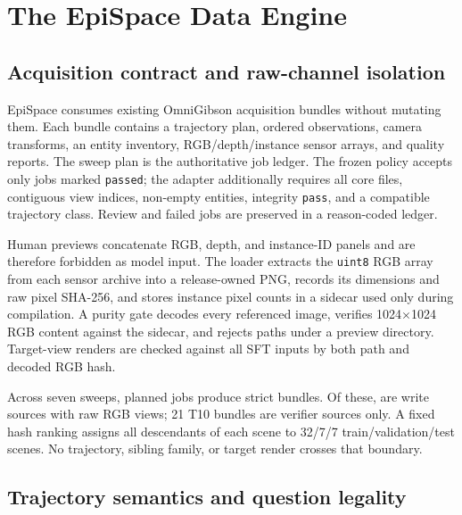 \section{The EpiSpace Data Engine}
\label{sec:engine}

\subsection{Acquisition contract and raw-channel isolation}

EpiSpace consumes existing OmniGibson acquisition bundles without mutating
them.  Each bundle contains a trajectory plan, ordered observations, camera
transforms, an entity inventory, RGB/depth/instance sensor arrays, and quality
reports.  The sweep plan is the authoritative job ledger.  The frozen policy
accepts only jobs marked \texttt{passed}; the adapter additionally requires all
core files, contiguous view indices, non-empty entities, integrity
\texttt{pass}, and a compatible trajectory class.  Review and failed jobs are
preserved in a reason-coded ledger.

Human previews concatenate RGB, depth, and instance-ID panels and are therefore
forbidden as model input.  The loader extracts the \texttt{uint8} RGB array from
each sensor archive into a release-owned PNG, records its dimensions and raw
pixel SHA-256, and stores instance pixel counts in a sidecar used only during
compilation.  A purity gate decodes every referenced image, verifies
1024$\times$1024 RGB content against the sidecar, and rejects paths under a
preview directory.  Target-view renders are checked against all SFT inputs by
both path and decoded RGB hash.

Across seven sweeps, \EpiPlannedJobs{} planned jobs produce
\EpiStrictBundles{} strict bundles.  Of these, \EpiSourceTrajectories{} are
write sources with \EpiSourceViews{} raw RGB views; 21 T10 bundles are verifier
sources only.  A fixed hash ranking assigns all descendants of each scene to
32/7/7 train/validation/test scenes.  No trajectory, sibling family, or target
render crosses that boundary.



\subsection{Trajectory semantics and question legality}


